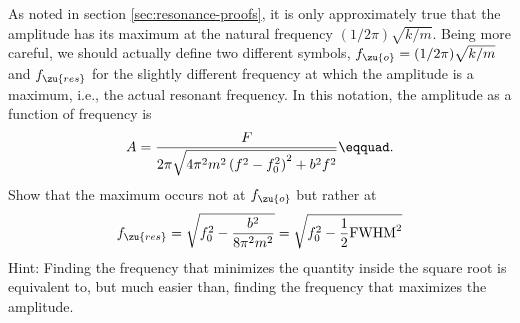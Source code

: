 As noted in section \ref{sec:resonance-proofs}, it is only approximately true
that the amplitude has its maximum at the natural frequency $(1/2\pi)\sqrt{k/m}$. Being more
careful, we should actually define two different symbols,
$f_\zu{o}=(1/2\pi)\sqrt{k/m}$ and $f_\zu{res}$ for the slightly different frequency at
which the amplitude is a maximum, i.e., the actual resonant
frequency. In this notation, the amplitude as a function of frequency is
\begin{equation*}
 A = \frac{F}{2\pi\sqrt{4\pi^2m^2\left(f^2-f_0^2\right)^2+b^2f^2}}\eqquad.
\end{equation*}
Show that the maximum occurs not at $f_\zu{o}$ but rather at 
\begin{equation*}
 f_\zu{res} = \sqrt{f_0^2-\frac{b^2}{8\pi^2m^2}} = \sqrt{f_0^2-\frac{1}{2}\text{FWHM}^2}
\end{equation*}
Hint: Finding the frequency that minimizes the quantity
inside the square root is equivalent to, but much easier
than, finding the frequency that maximizes the amplitude.
